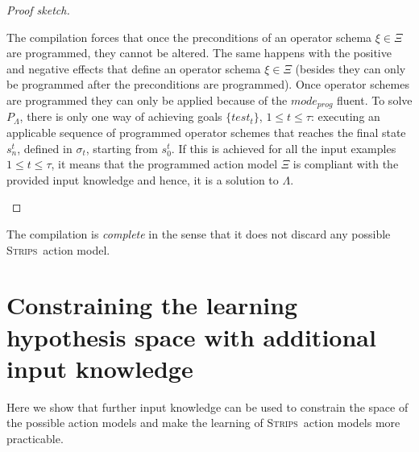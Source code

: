 \documentclass[letterpaper]{article} %
\newcommand{\strips}{\textsc{Strips}}     %
\begin{document}
\begin{proof}[Proof sketch]
\begin{small}
The compilation forces that once the preconditions of an operator schema $\xi \in \Xi$ are programmed, they cannot be altered. The same happens with the positive and negative effects that define an operator schema $\xi \in \Xi$ (besides they can only be programmed after the preconditions are programmed). Once operator schemes are programmed they can only be applied because of the $mode_{prog}$ fluent. To solve $P_{\Lambda}$, there is only one way of achieving goals $\{test_t\}$, {\small $1\leq t\leq \tau$}: executing an applicable sequence of programmed operator schemes that reaches the final state $s_n^t$, defined in $\sigma_t$, starting from $s_0^t$. If this is achieved for all the input examples {\small $1\leq t\leq \tau$}, it means that the programmed action model $\Xi$ is compliant with the provided input knowledge and hence, it is a solution to $\Lambda$.
\end{small}
\end{proof}

The compilation is {\em complete} in the sense that it does not discard any possible \strips\ action model.


\section{Constraining the learning hypothesis space with additional input knowledge}
\label{sec:Constraining}
Here we show that further input knowledge can be used to constrain the space of the possible action models and make the learning of \strips\ action models more practicable.
\end{document}
